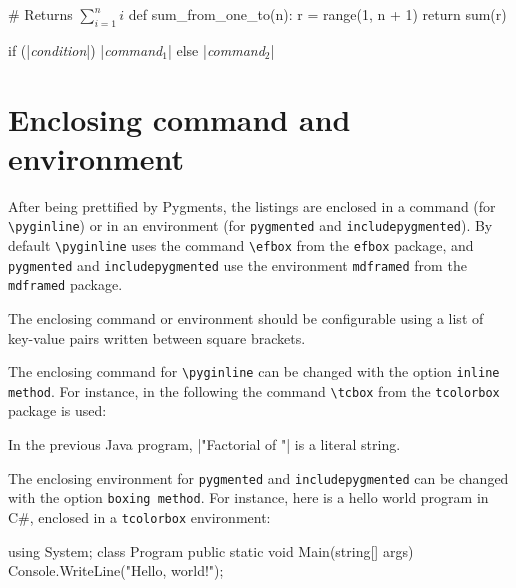 \documentclass[10pt,a4paper]{article}
\begin{document}
\begin{Example}
\begin{pygmented}[lang=python,mathescape]
# Returns $\sum_{i=1}^{n}i$
def sum_from_one_to(n):
    r = range(1, n + 1)
    return sum(r)
\end{pygmented}
\end{Example}

\begin{Example}
\begin{pygmented}[lang=c,escapeinside=||]

if (|\textit{condition}|)
    |\textit{command$_1$}|
else
    |\textit{command$_2$}|
\end{pygmented}
\end{Example}


\section{Enclosing command and environment}

After being prettified by Pygments, the listings are enclosed in a
command (for \verb|\pyginline|) or in an environment (for
\verb|pygmented| and \verb|includepygmented|). By default
\verb|\pyginline| uses the command \verb|\efbox| from the \texttt{efbox}
package, and \verb|pygmented| and \verb|includepygmented| use the
environment \verb|mdframed| from the \texttt{mdframed} package.

The enclosing command or environment should be configurable using a list
of key-value pairs written between square brackets.

The enclosing command for
\verb|\pyginline| can be changed with the option
\verb|inline method|. For instance, in the following the command
\verb|\tcbox| from the \verb|tcolorbox| package is used:

\begin{Example}
  In the previous Java program,
  \pyginline[lang=java,inline method=tcbox]|"Factorial of "| is a
  literal string.
\end{Example}

The enclosing environment for \verb|pygmented| and
\verb|includepygmented| can be changed with the option
\verb|boxing method|. For instance, here is a hello world program in
C\#, enclosed in a \verb|tcolorbox| environment:

\begin{Example}
\begin{pygmented}[lang=csharp,boxing method=tcolorbox]
using System;
class Program
{
    public static void Main(string[] args)
    {
        Console.WriteLine("Hello, world!");
    }
}
\end{pygmented}
\end{Example}
\end{document}
